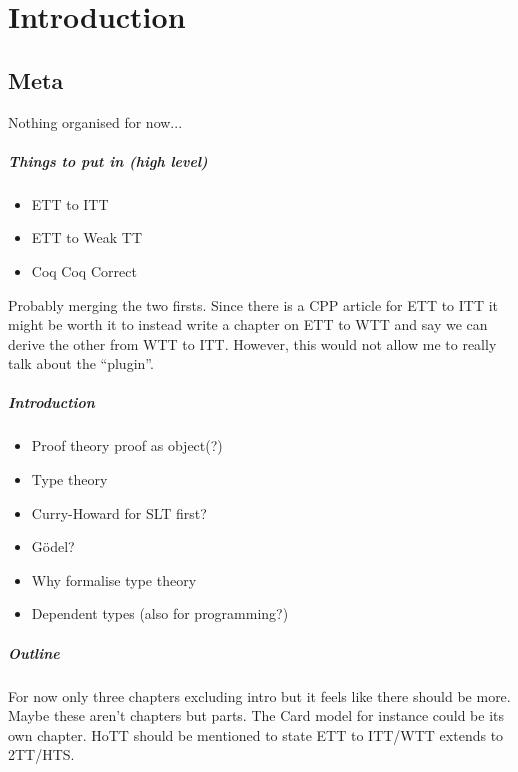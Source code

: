 \setchapterpreamble[u]{\margintoc}
\chapter{Introduction}

\section{Meta}

Nothing organised for now...

\paragraph{Things to put in (high level)}

\begin{itemize}
  \item ETT to ITT
  \item ETT to Weak TT
  \item Coq Coq Correct
\end{itemize}
%
Probably merging the two firsts. Since there is a CPP article for ETT to ITT
it might be worth it to instead write a chapter on ETT to WTT and say we can
derive the other from WTT to ITT.
However, this would not allow me to really talk about the ``plugin''.

\paragraph{Introduction}

\begin{itemize}
  \item Proof theory proof as object(?)
  \item Type theory
  \item Curry-Howard for SLT first?
  \item Gödel?
  \item Why formalise type theory
  \item Dependent types (also for programming?)
\end{itemize}

\paragraph{Outline}

For now only three chapters excluding intro but it feels like there should be
more. Maybe these aren't chapters but parts.
The Card model for instance could be its own chapter.
HoTT should be mentioned to state ETT to ITT/WTT extends to 2TT/HTS.

